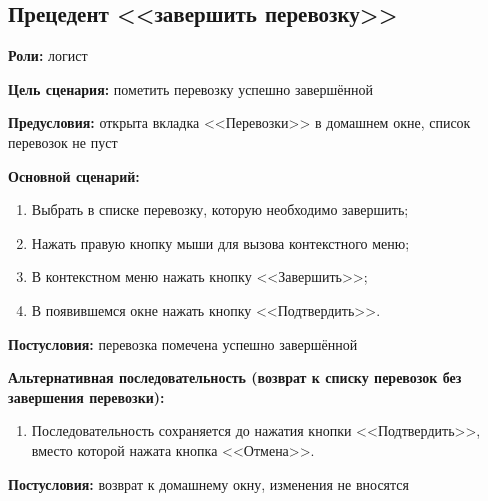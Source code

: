 \subsection{Прецедент <<завершить перевозку>>}
\textbf{Роли:} логист \par
\textbf{Цель сценария:} пометить перевозку успешно завершённой \par
\textbf{Предусловия:} открыта вкладка <<Перевозки>> в домашнем окне, 
     список перевозок не пуст \par
\textbf{Основной сценарий:} 
\begin{enumerate}
    \item Выбрать в списке перевозку, которую необходимо завершить;
    \item Нажать правую кнопку мыши для вызова контекстного меню;
    \item В контекстном меню нажать кнопку <<Завершить>>;
    \item В появившемся окне нажать кнопку <<Подтвердить>>.
\end{enumerate} \par
\textbf{Постусловия:} перевозка помечена успешно завершённой \par
\textbf{Альтернативная последовательность 
    (возврат к списку перевозок без завершения перевозки):} \par
\begin{enumerate}
    \item Последовательность сохраняется до нажатия кнопки <<Подтвердить>>, 
        вместо которой нажата кнопка <<Отмена>>.
\end{enumerate} \par
\textbf{Постусловия:} возврат к домашнему окну, изменения не вносятся \par

